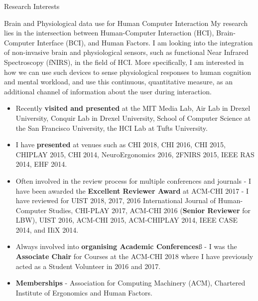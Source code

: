 \documentclass{resume} %
\begin{document}
\begin{rSection}{Research Interests}
\begin{rSubsection}{Brain and Physiological data use for Human Computer Interaction}{ }{ }{ }
\vspace{-5 mm}
My research lies in the intersection between Human-Computer Interaction (HCI), Brain-Computer Interface (BCI), and Human Factors. I am looking into the integration of non-invasive brain and physiological sensors, such as functional Near Infrared Spectroscopy (fNIRS), in the field of HCI. More specifically, I am interested in how we can use such devices to sense physiological responses to human cognition and mental workload, and use this continuous, quantitative measure, as an additional channel of information about the user during interaction.


\begin{itemize}
	\item Recently \textbf{visited and presented} at the MIT Media Lab, Air Lab in Drexel University, Conquir Lab in Drexel University, School of Computer Science at the San Francisco University, the HCI Lab at Tufts University.
	\item I have  \textbf{presented} at venues such as CHI 2018, CHI 2016, CHI 2015, CHIPLAY 2015, CHI 2014, NeuroErgonomics 2016, 2FNIRS 2015, IEEE RAS 2014, EHF 2014.
	\vspace{-2mm}
	\item Often involved in the review process for multiple conferences and journals - I have been awarded the \textbf{Excellent Reviewer Award} at ACM-CHI 2017 - I have reviewed for UIST 2018, 2017, 2016 International Journal of Human-Computer Studies, CHI-PLAY 2017, ACM-CHI 2016 (\textbf{Senior Reviewer} for LBW), UIST 2016, ACM-CHI 2015, ACM-CHIPLAY 2014, IEEE CASE 2014, and IIiX 2014.
	\vspace{-2mm}
	\item Always involved into \textbf{organising Academic Conferences}ß - I was the \textbf{Associate Chair} for Courses at the ACM-CHI 2018 where I have previously acted as a Student Volunteer in 2016 and 2017.
	\vspace{-2mm}
	\item  \textbf{Memberships} - Association for Computing Machinery (ACM), Chartered Institute of Ergonomics and Human Factors.
\end{itemize}

\end{rSubsection}

\end{rSection}
\end{document}
